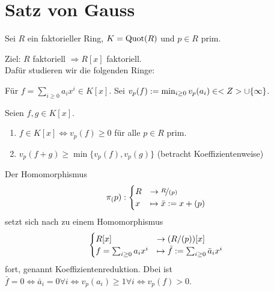 \section{Satz von Gauss}

Sei $R$ ein faktorieller Ring, $K= \operatorname{Quot}(R)$ und $p \in R$ prim.

\begin{remark}
	Ziel: $R$ faktoriell $\Rightarrow R[x]$ faktoriell.\\
	Dafür studieren wir die folgenden Ringe:
\end{remark}

\begin{definition}
	Für $f = \sum_{i \ge 0} a_i x^i \in K[x]$. Sei $v_p(f) := \min_{i \ge 0} v_p(a_i) \in <Z> \cup \{\infty\}$.
\end{definition}

\begin{remark}
	Seien $f,g \in K[x]$.
	\begin{enumerate}
		\item $f \in K[x] \Leftrightarrow v_p(f) \ge 0$ für alle $p \in R$ prim.
		\item $v_p(f+g) \ge \min\{v_p(f), v_p(g)\}$ (betracht Koeffizientenweise)
	\end{enumerate}
\end{remark}

\begin{definition}
	Der Homomorphismus
	\begin{align}
	\pi_(p): \begin{cases}
	R &\to \lnkset{R}{(p)} \\
	x &\mapsto \bar{x} := x + (p)
	\end{cases}\notag
	\end{align}
	setzt sich nach  zu einem Homomorphismus
	\begin{align}
	\begin{cases}
		R[x] &\to (R/(p))[x]\\
		f=\sum_{i \ge 0} a_i x^i &\mapsto \bar{f} := \sum_{i \ge 0} \bar{a}_i x^i
	\end{cases}\notag
	\end{align}
	fort, genannt Koeffizientenreduktion. Dbei ist $\bar{f} = 0 \Leftrightarrow \bar{a}_i = 0 \forall i \Leftrightarrow v_p(a_i) \ge 1 \forall i \Leftrightarrow v_p(f) > 0$.
\end{definition}
